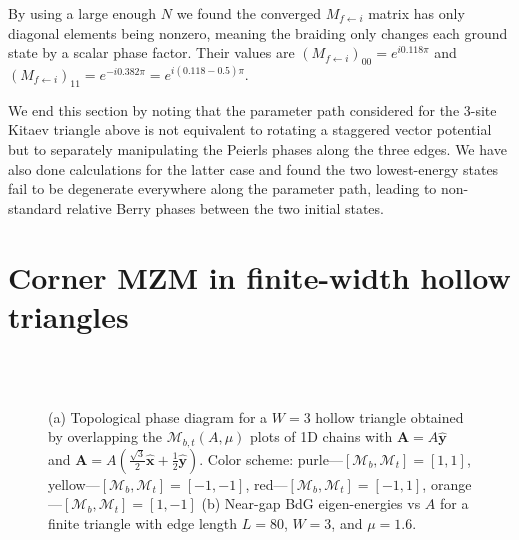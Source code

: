 \documentclass[aps,prb,showpacs,amsmath,amssymb,superscriptaddress]{revtex4-2}
\let\oldhat\hat
\renewcommand{\hat}[1]{\oldhat{\mathbf{#1}}}
\begin{document}
By using a large enough $N$ we found the converged $M_{f\leftarrow i}$ matrix has only diagonal elements being nonzero, meaning the braiding only changes each ground state by a scalar phase factor. Their values are $(M_{f\leftarrow i})_{00} = e^{i0.118\pi}$ and $(M_{f\leftarrow i})_{11} = e^{-i 0.382\pi} = e^{i(0.118-0.5)\pi}$.

We end this section by noting that the parameter path considered for the 3-site Kitaev triangle above is not equivalent to rotating a staggered vector potential but to separately manipulating the Peierls phases along the three edges. We have also done calculations for the latter case and found the two lowest-energy states fail to be degenerate everywhere along the parameter path, leading to non-standard relative Berry phases between the two initial states.

\section{Corner MZM in finite-width hollow triangles}

\begin{figure}[ht]
  \hspace{43pt}
   \\
  \vspace{-20pt}
   \\
  \caption{(a) Topological phase diagram for a $W=3$ hollow triangle obtained by overlapping the $\mathcal{M}_{b,t}(A, \mu)$ plots of 1D chains with $\mathbf A = A\hat{y}$ and $\mathbf A = A(\frac{\sqrt{3}}{2}\hat{x}+\frac{1}{2}\hat{y})$. Color scheme: purle---$[\mathcal{M}_b,\mathcal{M}_t]=[1,1]$, yellow---$[\mathcal{M}_b,\mathcal{M}_t]=[-1,-1]$, red---$[\mathcal{M}_b,\mathcal{M}_t]=[-1,1]$, orange---$[\mathcal{M}_b,\mathcal{M}_t]=[1,-1]$ (b) Near-gap BdG eigen-energies vs $A$ for a finite triangle with edge length $L=80$, $W=3$, and $\mu=1.6$.}
  \label{fig: supp pd}
\end{figure}
\end{document}

